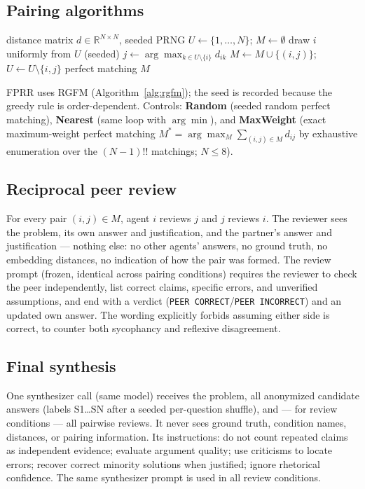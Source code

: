 \documentclass[11pt]{article}
\begin{document}
\subsection{Pairing algorithms}
\begin{algorithm}[t]
\caption{Randomized Greedy Farthest Matching (RGFM)}
\label{alg:rgfm}
\begin{algorithmic}[1]
\Require distance matrix $d \in \mathbb{R}^{N\times N}$, seeded PRNG
\State $U \gets \{1,\dots,N\}$; $M \gets \emptyset$
  \State draw $i$ uniformly from $U$ (seeded)
  \State $j \gets \arg\max_{k \in U \setminus \{i\}} d_{ik}$
  \State $M \gets M \cup \{(i,j)\}$; $U \gets U \setminus \{i,j\}$
\EndWhile
\State \Return perfect matching $M$
\end{algorithmic}
\end{algorithm}

FPRR uses RGFM (Algorithm~\ref{alg:rgfm}); the seed is recorded because the greedy rule is order-dependent. Controls: \textbf{Random} (seeded random perfect matching), \textbf{Nearest} (same loop with $\arg\min$), and \textbf{MaxWeight} (exact maximum-weight perfect matching $M^* = \arg\max_M \sum_{(i,j)\in M} d_{ij}$ by exhaustive enumeration over the $(N-1)!!$ matchings; $N \le 8$).

\subsection{Reciprocal peer review}
For every pair $(i,j) \in M$, agent $i$ reviews $j$ and $j$ reviews $i$. The reviewer sees the problem, its own answer and justification, and the partner's answer and justification — nothing else: no other agents' answers, no ground truth, no embedding distances, no indication of how the pair was formed. The review prompt (frozen, identical across pairing conditions) requires the reviewer to check the peer independently, list correct claims, specific errors, and unverified assumptions, and end with a verdict (\texttt{PEER CORRECT}/\texttt{PEER INCORRECT}) and an updated own answer. The wording explicitly forbids assuming either side is correct, to counter both sycophancy and reflexive disagreement.

\subsection{Final synthesis}
One synthesizer call (same model) receives the problem, all anonymized candidate answers (labels S1\dots SN after a seeded per-question shuffle), and — for review conditions — all pairwise reviews. It never sees ground truth, condition names, distances, or pairing information. Its instructions: do not count repeated claims as independent evidence; evaluate argument quality; use criticisms to locate errors; recover correct minority solutions when justified; ignore rhetorical confidence. The same synthesizer prompt is used in all review conditions.
\end{document}
